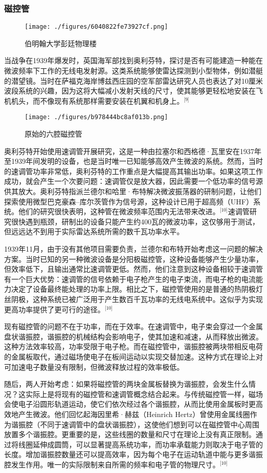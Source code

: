 \subsubsection{磁控管}
\begin{figure}[ht]
\centering
\texttt{[image: ./figures/6040822fe73927cf.png]}
\caption{伯明翰大学彭廷物理楼} \label{fig_YHldr_2}
\end{figure}
当战争在1939年爆发时，英国海军部找到奥利芬特，探讨是否有可能建造一种能在微波频率下工作的无线电发射源。这类系统能够使雷达探测到小型物体，例如潜艇的潜望镜。当时在萨福克海岸博兹西庄园的空军部雷达研究人员也表达了对10厘米波段系统的兴趣，因为这将大幅减小发射天线的尺寸，使其能够更轻松地安装在飞机机头，而不像现有系统那样需要安装在机翼和机身上。\(^\text{[9]}\)
\begin{figure}[ht]
\centering
\texttt{[image: ./figures/b978444bc8af013b.png]}
\caption{原始的六腔磁控管} \label{fig_YHldr_3}
\end{figure}
奥利芬特开始使用速调管开展研究，这是一种由拉塞尔和西格德·瓦里安在1937年至1939年间发明的设备，也是当时唯一已知能够高效产生微波的系统。然而，当时的速调管功率非常低，奥利芬特的工作重点是大幅提高其输出功率。如果这项工作成功，就会产生一个次要问题：速调管仅是放大器，因此需要一个低功率的信号源供其放大。奥利芬特指派兰德尔和哈里·布特解决微波振荡器的研制问题，让他们探索使用微型巴克豪森–库尔茨管作为信号源，这种设计已用于超高频（UHF）系统。他们的研究很快表明，这种管在微波频率范围内无法带来改进。\(^\text{[10]}\)速调管研究很快遇到瓶颈，研制出的设备只能产生约400瓦的微波功率，这仅够用于测试，但远远达不到用于实际雷达系统所需的数千瓦功率水平。

1939年11月，由于没有其他项目需要负责，兰德尔和布特开始考虑这一问题的解决方案。当时已知的另一种微波设备是分阳极磁控管，这种设备能够产生少量功率，但效率低下，且输出通常比速调管更低。然而，他们注意到这种设备相较于速调管有一个巨大优势：速调管的信号依赖于电子枪产生的电子束流，而电子枪的电流能力决定了设备最终能处理的功率上限。相比之下，磁控管使用的是普通的热阴极灯丝阴极，这种系统已被广泛用于产生数百千瓦功率的无线电系统中。这似乎为实现更高功率提供了更可行的途径。\(^\text{[10]}\)

现有磁控管的问题不在于功率，而在于效率。在速调管中，电子束会穿过一个金属盘状谐振腔，谐振腔的机械结构会影响电子，使其加速和减速，从而释放出微波。这种方法效率较高，功率受限于电子枪。而在磁控管中，谐振腔被两块带相反电荷的金属板取代，通过磁场使电子在板间运动以实现交替加速。这种方式在理论上对可加速电子数量没有限制，但微波释放过程的效率极低。

随后，两人开始考虑：如果将磁控管的两块金属板替换为谐振腔，会发生什么情况？这实际上是将现有的磁控管和速调管概念结合起来。与传统磁控管一样，磁场会使电子沿圆形轨道运动，使它们依次经过各个谐振腔，从而比使用金属板时更高效地产生微波。他们回忆起海因里希·赫兹（Heinrich Hertz）曾使用金属线圈作为谐振腔（不同于速调管中的盘状谐振腔），这使他们想到可以在磁控管中心周围放置多个谐振腔。更重要的是，这些线圈的数量和尺寸在理论上没有真正限制。通过将线圈延伸成圆筒，可以显著提高系统功率，而功率承载能力则取决于电子管的长度。增加谐振腔数量还可以提高效率，因为每个电子在运动轨道中能与更多谐振腔发生作用。唯一的实际限制来自所需的频率和电子管的物理尺寸。\(^\text{[10]}\)

